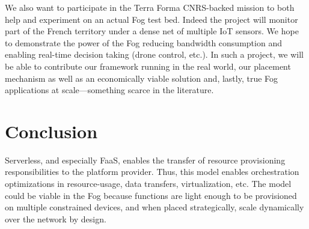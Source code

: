 \documentclass[11pt]{sdm}
\begin{document}
We also want to participate in the Terra Forma \cite{longuevergne_terra_2022} CNRS-backed mission to both help and experiment on an actual Fog test bed. Indeed the project will monitor part of the French territory under a dense net of multiple \gls{IoT} sensors. We hope to demonstrate the power of the Fog reducing bandwidth consumption and enabling real-time decision taking (drone control, etc.). In such a project, we will be able to contribute our framework running in the real world, our placement mechanism as well as an economically viable solution and, lastly, true Fog applications at scale—something scarce in the literature.

\section{Conclusion}


Serverless, and especially \gls{FaaS}, enables the transfer of resource provisioning responsibilities to the platform provider. Thus, this model enables orchestration optimizations in resource-usage, data transfers, virtualization, etc. The model could be viable in the Fog because functions are light enough to be provisioned on multiple constrained devices, and when placed strategically, scale dynamically over the network by design.
\end{document}
